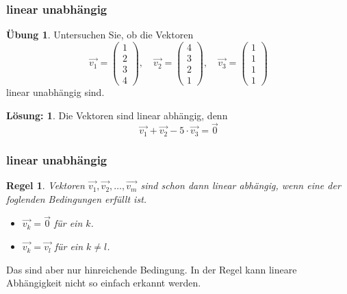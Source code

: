 \documentclass[hyperref={pdfpagelabels=false}]{beamer}
\theoremstyle{plain}%
\newtheorem*{regel}{Regel}
\theoremstyle{definition}
\newtheorem*{uebung}{Übung}
\newtheorem*{sol}{Lösung:}
\theoremstyle{remark}
\newcommand{\vektor}[1]{\overrightarrow{#1}}
\begin{document}
\begin{frame}
\frametitle{linear unabhängig}

\begin{uebung}
Untersuchen Sie, ob die Vektoren 
	$$ \vektor{v_1} = \left( \begin{matrix} 1 \\ 2 \\ 3 \\ 4 \end{matrix} \right), \quad 
	\vektor{v_2} = \left( \begin{matrix} 4 \\ 3 \\ 2 \\ 1 \end{matrix} \right), \quad 
	\vektor{v_3} = \left( \begin{matrix} 1 \\ 1 \\ 1 \\ 1 \end{matrix} \right) $$ 
linear unabhängig sind.
\end{uebung}

\bigbreak

\pause \pause 

\begin{sol} Die Vektoren sind linear abhängig, denn 
	$$ \vektor{v_1} + \vektor{v_2} - 5 \cdot \vektor{v_3} = \vektor{0} $$
\end{sol}
\end{frame}

\begin{frame}
\frametitle{linear unabhängig}

\begin{regel}
Vektoren $\vektor{v_1}, \vektor{v_2}, \ldots, \vektor{v_m}$ sind 
schon dann linear abhängig, wenn eine der foglenden Bedingungen erfüllt ist. 
\begin{itemize}
\item<2-> $\vektor{v_k} = \vektor{0}$ für ein $k$.
\item<3-> $\vektor{v_k} = \vektor{v_l}$ für ein $k \neq l$.
\end{itemize}
\end{regel}

\pause \pause \pause 

\bigbreak

Das sind aber nur hinreichende Bedingung. In der Regel kann lineare Abhängigkeit nicht so einfach erkannt werden. 

\end{frame}
\end{document}
